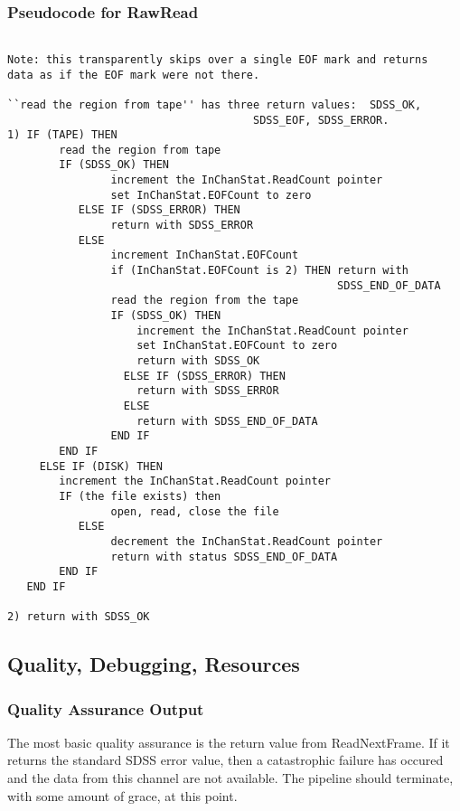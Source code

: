 \subsubsection{Pseudocode for RawRead}
\begin{verbatim}

Note: this transparently skips over a single EOF mark and returns
data as if the EOF mark were not there.  

``read the region from tape'' has three return values:  SDSS_OK,
                                      SDSS_EOF, SDSS_ERROR.
1) IF (TAPE) THEN
        read the region from tape
        IF (SDSS_OK) THEN
                increment the InChanStat.ReadCount pointer
                set InChanStat.EOFCount to zero
           ELSE IF (SDSS_ERROR) THEN
                return with SDSS_ERROR
           ELSE
                increment InChanStat.EOFCount
                if (InChanStat.EOFCount is 2) THEN return with 
                                                   SDSS_END_OF_DATA
                read the region from the tape
                IF (SDSS_OK) THEN
                    increment the InChanStat.ReadCount pointer
                    set InChanStat.EOFCount to zero
                    return with SDSS_OK
                  ELSE IF (SDSS_ERROR) THEN
                    return with SDSS_ERROR
                  ELSE
                    return with SDSS_END_OF_DATA
                END IF
        END IF
     ELSE IF (DISK) THEN
        increment the InChanStat.ReadCount pointer
        IF (the file exists) then
                open, read, close the file
           ELSE
                decrement the InChanStat.ReadCount pointer
                return with status SDSS_END_OF_DATA
        END IF
   END IF

2) return with SDSS_OK

\end{verbatim}

\subsection{Quality, Debugging, Resources}

\subsubsection{Quality Assurance Output}

The most basic quality assurance is the return value from ReadNextFrame.
If it returns the standard SDSS error value, then a catastrophic failure 
has occured and the data from this channel are not available.  The pipeline
should terminate, with some amount of grace, at this point.

